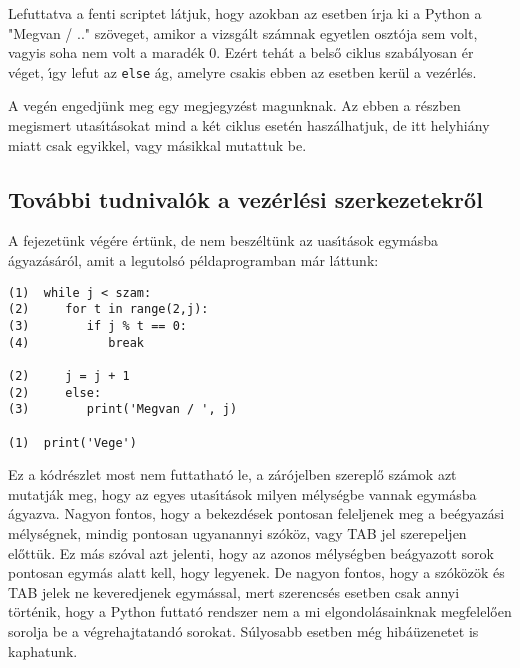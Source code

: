 \documentclass[12pt]{article}
\begin{document}
Lefuttatva a fenti scriptet l\'atjuk, hogy azokban az esetben \'{\i}rja ki a Python a "Megvan / .." sz\"oveget, 
amikor a vizsg\'alt sz\'amnak egyetlen oszt\'oja sem volt, vagyis soha nem volt a marad\'ek 0. Ez\'ert teh\'at 
a bels\H{o} ciklus szab\'alyosan \'er v\'eget, \'{\i}gy lefut az {\tt else} \'ag, amelyre csakis ebben az esetben 
ker\"ul a vez\'erl\'es.

A veg\'en engedj\"unk meg egy megjegyz\'est magunknak. Az ebben a r\'eszben megismert utas\'{\i}t\'asokat mind a 
k\'et ciklus eset\'en hasz\'alhatjuk, de itt helyhi\'any miatt csak egyikkel, vagy m\'asikkal mutattuk be.

\subsection{Tov\'abbi tudnival\'ok a vez\'erl\'esi szerkezetekr\H{o}l}

A fejezet\"unk v\'eg\'ere \'ert\"unk, de nem besz\'elt\"unk az uas\'{\i}t\'asok egym\'asba 
\'agyaz\'as\'ar\'ol, amit a legutols\'o p\'eldaprogramban m\'ar l\'attunk:

\begin{Verbatim}[fontsize=\small]
(1)  while j < szam:
(2)     for t in range(2,j):
(3)        if j % t == 0:
(4)           break

(2)     j = j + 1
(2)     else:
(3)        print('Megvan / ', j)

(1)  print('Vege')   
\end{Verbatim}

Ez a k\'odr\'eszlet most nem futtathat\'o le, a z\'ar\'ojelben szerepl\H{o} sz\'amok azt mutatj\'ak meg, hogy 
az egyes utas\'{\i}t\'asok milyen m\'elys\'egbe vannak egym\'asba \'agyazva. Nagyon fontos, hogy a bekezd\'esek 
pontosan feleljenek meg a be\'egyaz\'asi m\'elys\'egnek, mindig pontosan ugyanannyi sz\'ok\"oz, vagy TAB jel  
szerepeljen el\H{o}tt\"uk. Ez m\'as sz\'oval azt jelenti, hogy az azonos m\'elys\'egben be\'agyazott sorok 
pontosan egym\'as alatt kell, hogy legyenek. De nagyon fontos, hogy a sz\'ok\"oz\"ok \'es TAB jelek ne keveredjenek 
egym\'assal, mert szerencs\'es esetben csak annyi t\"ort\'enik, hogy a Python futtat\'o rendszer nem a mi 
elgondol\'asainknak megfelel\H{o}en sorolja be a v\'egrehajtatand\'o sorokat. S\'ulyosabb esetben m\'eg 
hib\'a\"uzenetet is kaphatunk.
\end{document}
